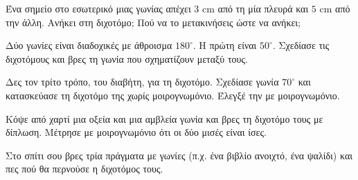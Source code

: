 \ex Ένα σημείο στο εσωτερικό μιας γωνίας απέχει $3$ cm από τη μία πλευρά και $5$ cm από την άλλη. Ανήκει στη διχοτόμο; Πού να το μετακινήσεις ώστε να ανήκει;

\ex Δύο γωνίες είναι διαδοχικές με άθροισμα $180^\circ$. Η πρώτη είναι $50^\circ$. Σχεδίασε τις διχοτόμους και βρες τη γωνία που σχηματίζουν μεταξύ τους.

\ex Δες τον τρίτο τρόπο, του διαβήτη, για τη διχοτόμο. Σχεδίασε γωνία $70^\circ$ και κατασκεύασε τη διχοτόμο της χωρίς μοιρογνωμόνιο. Έλεγξέ την με μοιρογνωμόνιο.


\ex Κόψε από χαρτί μια οξεία και μια αμβλεία γωνία και βρες τη διχοτόμο τους με δίπλωση. Μέτρησε με μοιρογνωμόνιο ότι οι δύο μισές είναι ίσες.

\ex Στο σπίτι σου βρες τρία πράγματα με γωνίες (π.χ. ένα βιβλίο ανοιχτό, ένα ψαλίδι) και πες πού θα περνούσε η διχοτόμος τους.
